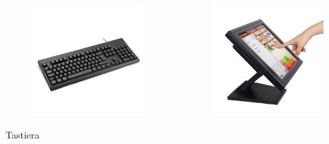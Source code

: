 \documentclass[handout]{beamer}
\begin{document}
\begin{frame}
\begin{columns}
\begin{column}{.22\textwidth}
\begin{center}
\begin{figure}
      \includegraphics[width=\columnwidth]{img/tastiera.jpg}
    \end{figure}
    Tastiera
    \end{center}
\end{column}
\begin{column}{.22\textwidth}
  \begin{center} 
    \begin{figure}
      \includegraphics[width=\columnwidth]{img/touchscreen.jpg}

\end{figure}
\end{center}
\end{column}
\end{columns}
\end{frame}
\end{document}
